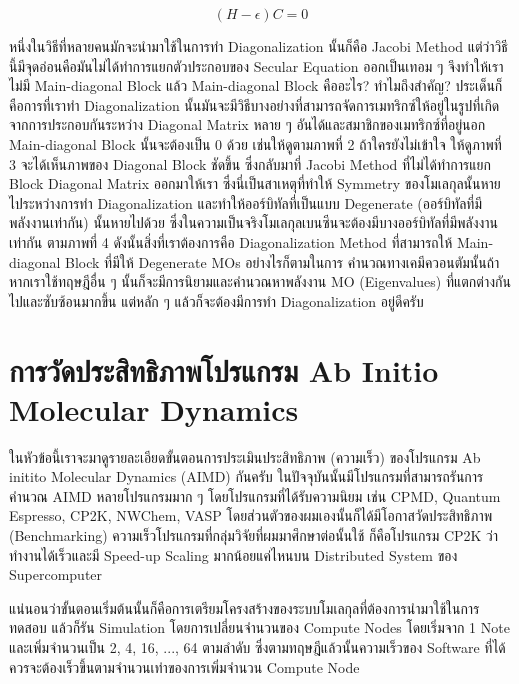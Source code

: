 \begin{equation}
  (H - \epsilon)C = 0
\end{equation}

หนึ่งในวิธีที่หลายคนมักจะนำมาใช้ในการทำ Diagonalization นั้นก็คือ Jacobi Method แต่ว่าวิธีนี้มีจุดอ่อนคือมันไม่ได้ทำการแยกตัวประกอบของ
Secular Equation ออกเป็นเทอม ๆ จึงทำให้เราไม่มี Main-diagonal Block แล้ว Main-diagonal Block คืออะไร? ทำไมถึงสำคัญ?
ประเด็นก็คือการที่เราทำ Diagonalization นั้นมันจะมีวิธีบางอย่างที่สามารถจัดการเมทริกซ์ให้อยู่ในรูปที่เกิดจากการประกอบกันระหว่าง Diagonal
Matrix หลาย ๆ อันได้และสมาชิกของเมทริกซ์ที่อยู่นอก Main-diagonal Block นั้นจะต้องเป็น 0 ด้วย เช่นให้ดูตามภาพที่ 2 ถ้าใครยังไม่เข้าใจ%
ให้ดูภาพที่ 3 จะได้เห็นภาพของ Diagonal Block ชัดขึ้น ซึ่งกลับมาที่ Jacobi Method ที่ไม่ได้ทำการแยก Block Diagonal Matrix
ออกมาให้เรา ซึ่งนี่เป็นสาเหตุที่ทำให้ Symmetry ของโมเลกุลนั้นหายไประหว่างการทำ Diagonalization และทำให้ออร์บิทัลที่เป็นแบบ Degenerate
(ออร์บิทัลที่มีพลังงานเท่ากัน) นั้นหายไปด้วย ซึ่งในความเป็นจริงโมเลกุลเบนซีนจะต้องมีบางออร์บิทัลที่มีพลังงานเท่ากัน ตามภาพที่ 4
ดังนั้นสิ่งที่เราต้องการคือ Diagonalization Method ที่สามารถให้ Main-diagonal Block ที่มีให้ Degenerate MOs อย่างไรก็ตามในการ%
คำนวณทางเคมีควอนตัมนั้นถ้าหากเราใช้ทฤษฎีอื่น ๆ นั้นก็จะมีการนิยามและคำนวณหาพลังงาน MO (Eigenvalues) ที่แตกต่างกันไปและซับซ้อนมากขึ้น
แต่หลัก ๆ แล้วก็จะต้องมีการทำ Diagonalization อยู่ดีครับ

\section{การวัดประสิทธิภาพโปรแกรม Ab Initio Molecular Dynamics}

ในหัวข้อนี้เราจะมาดูรายละเอียดขั้นตอนการประเมินประสิทธิภาพ (ความเร็ว) ของโปรแกรม Ab initito Molecular Dynamics (AIMD) กันครับ
ในปัจจุบันนั้นมีโปรแกรมที่สามารถรันการคำนวณ AIMD หลายโปรแกรมมาก ๆ โดยโปรแกรมที่ได้รับความนิยม เช่น CPMD, Quantum Espresso,
CP2K, NWChem, VASP โดยส่วนตัวของผมเองนั้นก็ได้มีโอกาสวัดประสิทธิภาพ (Benchmarking) ความเร็วโปรแกรมที่กลุ่มวิจัยที่ผมมาศึกษาต่อนั้นใช้
ก็คือโปรแกรม CP2K ว่าทำงานได้เร็วและมี Speed-up Scaling มากน้อยแค่ไหนบน Distributed System ของ Supercomputer

แน่นอนว่าขั้นตอนเริ่มต้นนั้นก็คือการเตรียมโครงสร้างของระบบโมเลกุลที่ต้องการนำมาใช้ในการทดสอบ แล้วก็รัน Simulation โดยการเปลี่ยนจำนวนของ
Compute Nodes โดยเริ่มจาก 1 Note และเพิ่มจำนวนเป็น 2, 4, 16, ..., 64 ตามลำดับ ซึ่งตามทฤษฎีแล้วนั้นความเร็วของ Software
ที่ได้ควรจะต้องเร็วขึ้นตามจำนวนเท่าของการเพิ่มจำนวน Compute Node

